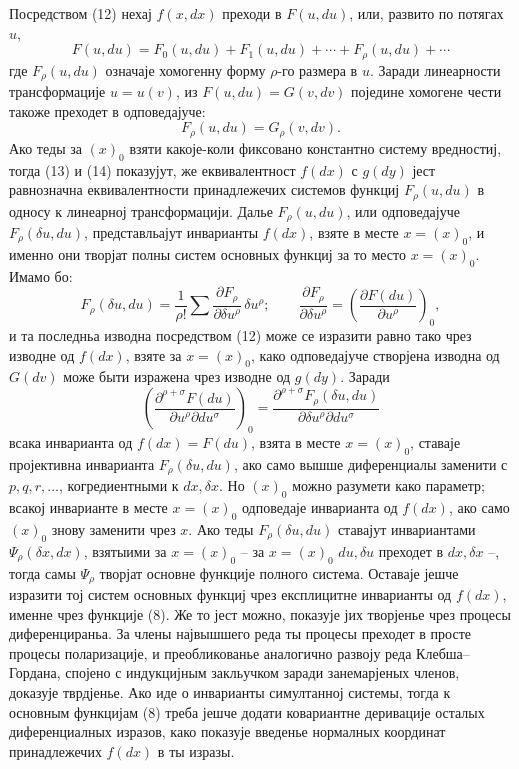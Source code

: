 ﻿\documentclass[11pt]{article}
\begin{document}
Посредством (12) нехај \(f(x,dx)\) преходи в \(F(u,du)\), или, развито по потягах \(u\),
\begin{equation}
F(u,du)=F_0(u,du)+F_1(u,du)+\cdots+F_\rho(u,du)+\cdots
\tag{13}
\end{equation}
где \(F_\rho(u,du)\) означаје хомогенну форму \(\rho\)-го размера в \(u\). Заради линеарности трансформације \(u=u(v)\), из \(F(u,du)=G(v,dv)\) поједине хомогене чести такоже преходет в одповедајуче:
\begin{equation}
F_\rho(u,du)=G_\rho(v,dv).
\tag{14}
\end{equation}
Ако теды за \((x)_0\) взяти какоје-коли фиксовано константно систему вредностиј, тогда (13) и (14) показујут, же еквивалентност \(f(dx)\) с \(g(dy)\) јест равнозначна еквивалентности принадлежечих системов функциј \(F_\rho(u,du)\) в односу к линеарној трансформацији. Далье \(F_\rho(u,du)\), или одповедајуче \(F_\rho(\delta u,du)\), представльајут инварианты \(f(dx)\), взяте в месте \(x=(x)_0\), и именно они творјат полны систем основных функциј за то место \(x=(x)_0\). Имамо бо:
\[
F_\rho(\delta u,du)=\frac1{\rho!}\sum
\frac{\partial F_\rho}{\partial \delta u^\rho}\,\delta u^\rho;
\qquad
\frac{\partial F_\rho}{\partial \delta u^\rho}
=\left(\frac{\partial F(du)}{\partial u^\rho}\right)_0,
\]
и та последньа изводна посредством (12) може се изразити равно тако чрез изводне од \(f(dx)\), взяте за \(x=(x)_0\), како одповедајуче створјена изводна од \(G(dv)\) може быти изражена чрез изводне од \(g(dy)\). Заради
\[
\left(\frac{\partial^{\rho+\sigma}F(du)}
{\partial u^\rho\partial du^\sigma}\right)_0
=
\frac{\partial^{\rho+\sigma}F_\rho(\delta u,du)}
{\partial\delta u^\rho\partial du^\sigma}
\]
всака инварианта од \(f(dx)=F(du)\), взята в месте \(x=(x)_0\), ставаје пројективна инварианта \(F_\rho(\delta u,du)\), ако само вышше диференциалы заменити с \(p,q,r,\ldots\), когредиентными к \(dx,\delta x\). Но \((x)_0\) можно разумети како параметр; всакој инварианте в месте \(x=(x)_0\) одповедаје инварианта од \(f(dx)\), ако само \((x)_0\) знову заменити чрез \(x\). Ако теды \(F_\rho(\delta u,du)\) ставајут инвариантами \(\Psi_\rho(\delta x,dx)\), взятыими за \(x=(x)_0\) -- за \(x=(x)_0\) \(du,\delta u\) преходет в \(dx,\delta x\) --, тогда самы \(\Psi_\rho\) творјат основне функције полного система. Оставаје јешче изразити тој систем основных функциј чрез експлицитне инварианты од \(f(dx)\), именне чрез функције (8). Же то јест можно, показује јих творјенье чрез процесы диференцираньа. За члены највышшего реда ты процесы преходет в просте процесы поларизације, и преобликованье аналогично развоју реда Клебша--Гордана, спојено с индукцијным закльучком заради занемарјеных членов, доказује тврдјенье. Ако иде о инварианты симултанној системы, тогда к основным функцијам (8) треба јешче додати ковариантне деривације осталых диференциалных изразов, како показује введенье нормалных координат принадлежечих \(f(dx)\) в ты изразы.
\end{document}
